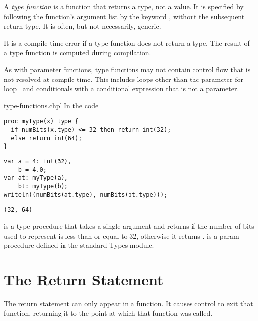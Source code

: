 A \emph{type function} is a function that returns a type, not a value.  It is
specified by following the function's argument list by the keyword ,
without the subsequent return type.  It is often, but not necessarily, generic.

It is a compile-time error if a type function does not return a type.
The result of a type function is computed during compilation.

As with parameter functions, type functions may not contain control
flow that is not resolved at compile-time.  This includes loops other
than the parameter for loop~ and
conditionals with a conditional expression that is not a parameter.

\begin{chapelexample}{type-functions.chpl}
In the code
\begin{chapel}
\begin{verbatim}
proc myType(x) type {
  if numBits(x.type) <= 32 then return int(32);
  else return int(64);
}
\end{verbatim}
\end{chapel}
\begin{chapelpost}
\begin{verbatim}
var a = 4: int(32),
    b = 4.0;
var at: myType(a),
    bt: myType(b);
writeln((numBits(at.type), numBits(bt.type)));
\end{verbatim}
\end{chapelpost}
\begin{chapeloutput}
\begin{verbatim}
(32, 64)
\end{verbatim}
\end{chapeloutput}
 is a type procedure that takes a single
argument  and returns  if the number of bits used to
represent  is less than or equal to 32, otherwise it
returns .   is a param
procedure defined in the standard Types module.
\end{chapelexample}


\section{The Return Statement}
\label{The_Return_Statement}

The return statement can only appear in a function.  It causes control
to exit that function, returning it to the point at which that function
was called.

